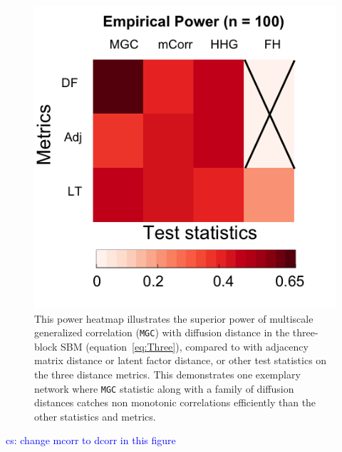\documentclass[11pt]{article}
\theoremstyle{definition}
\newcommand{\cs}[1]{\textcolor{blue}{cs: #1}}
\begin{document}
\begin{figure}
	\centering
	\includegraphics[width=0.4\paperwidth, height=0.4\paperwidth]{ThreeSBM_results_simple.png}
	\caption{This power heatmap illustrates the superior power of multiscale generalized correlation (\texttt{MGC}) with diffusion distance in the three-block SBM (equation~\ref{eq:Three}), compared to with adjacency matrix distance or latent factor distance, or other test statistics on the three distance metrics. This demonstrates one exemplary network where \texttt{MGC} statistic along with a family of diffusion distances catches non monotonic correlations efficiently than the other statistics and metrics.}
	\label{fig:threeSBM}
\end{figure}
\cs{change mcorr to dcorr in this figure}
\end{document}
